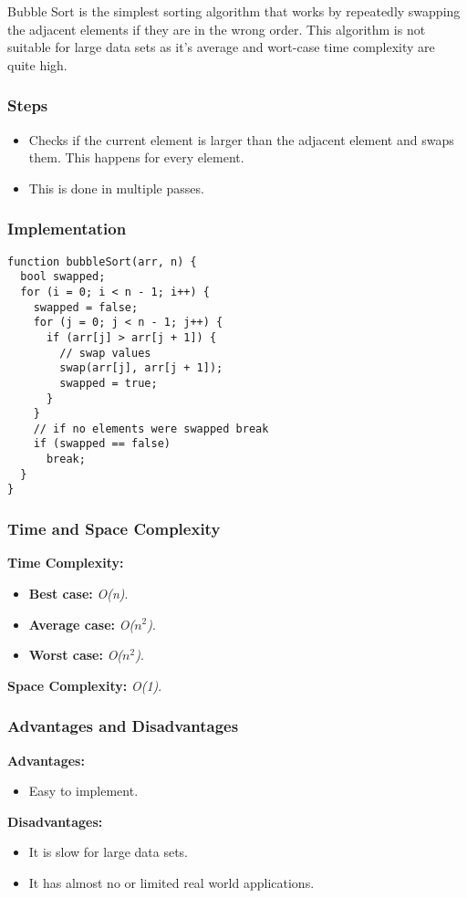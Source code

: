 Bubble Sort is the simplest sorting algorithm that works by repeatedly swapping the adjacent elements if they are in the wrong order. This algorithm is not suitable for large data sets as it's average and wort-case time complexity are quite high.

\subsubsection*{Steps}

\begin{itemize}
  \item Checks if the current element is larger than the adjacent element and swaps them. This happens for every element.
  \item This is done in multiple passes.
\end{itemize}

\subsubsection*{Implementation}

\begin{lstlisting}[style=general]
function bubbleSort(arr, n) {
  bool swapped;
  for (i = 0; i < n - 1; i++) {
    swapped = false;
    for (j = 0; j < n - 1; j++) {
      if (arr[j] > arr[j + 1]) {
        // swap values
        swap(arr[j], arr[j + 1]);
        swapped = true;
      }
    }
    // if no elements were swapped break
    if (swapped == false)
      break;
  }
}
\end{lstlisting}

\subsubsection*{Time and Space Complexity}

\textbf{Time Complexity:}

\begin{itemize}
  \item \textbf{Best case:} \textit{O(n)}.
  \item \textbf{Average case:} \emph{O($n^2$)}.
  \item \textbf{Worst case:} \textit{O($n^2$)}.
\end{itemize}

\textbf{Space Complexity:} \textit{O(1)}.

\subsubsection*{Advantages and Disadvantages}

\textbf{Advantages:}

\begin{itemize}
  \item Easy to implement.
\end{itemize}

\textbf{Disadvantages:}

\begin{itemize}
  \item It is slow for large data sets.
  \item It has almost no or limited real world applications.
\end{itemize}
